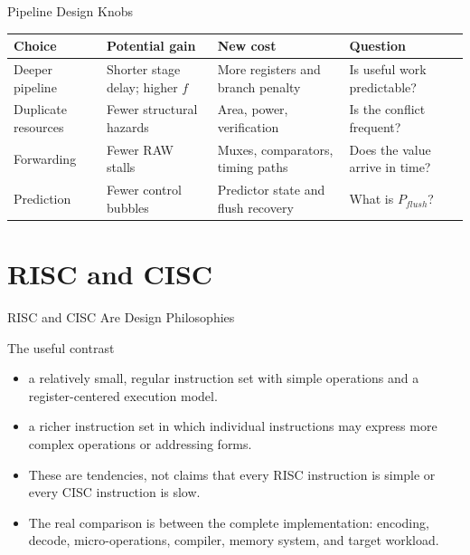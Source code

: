 \documentclass[aspectratio=169]{beamer}
\begin{document}
\begin{frame}{Pipeline Design Knobs}
  \begin{tabular}{@{}p{2.8cm}p{3.3cm}p{3.3cm}p{2.8cm}@{}}
    \toprule
    \textbf{Choice} & \textbf{Potential gain} & \textbf{New cost} & \textbf{Question}\\
    \midrule
    Deeper pipeline & Shorter stage delay; higher $f$ & More registers and branch penalty & Is useful work predictable?\\
    Duplicate resources & Fewer structural hazards & Area, power, verification & Is the conflict frequent?\\
    Forwarding & Fewer RAW stalls & Muxes, comparators, timing paths & Does the value arrive in time?\\
    Prediction & Fewer control bubbles & Predictor state and flush recovery & What is $P_{flush}$?\\
    \bottomrule
  \end{tabular}
  \vspace{0.2cm}
\end{frame}


\section{RISC and CISC}

\begin{frame}{RISC and CISC Are Design Philosophies}
  \begin{block}{The useful contrast}
    \begin{itemize}
      \item {} a relatively small, regular instruction set with
        simple operations and a register-centered execution model.
      \item {} a richer instruction set in which individual
        instructions may express more complex operations or addressing forms.
    \end{itemize}
  \end{block}
  \begin{itemize}
    \item These are tendencies, not claims that every RISC instruction is
      simple or every CISC instruction is slow.
    \item The real comparison is between the complete implementation:
      encoding, decode, micro-operations, compiler, memory system, and target
      workload.
  \end{itemize}
\end{frame}
\end{document}
